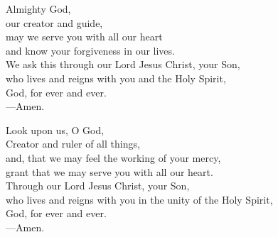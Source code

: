\prayer


\begin{prayerverse}
Almighty God,\\
our creator and guide,\\
may we serve you with all our heart\\
and know your forgiveness in our lives.\\
We ask this through our Lord Jesus Christ, your Son,\\
who lives and reigns with you and the Holy Spirit,\\
God, for ever and ever.\\
{\color{red}---\thinspace}Amen.
\end{prayerverse}


\begin{prayerverse}
Look upon us, O God,\\
Creator and ruler of all things,\\
and, that we may feel the working of your mercy,\\
grant that we may serve you with all our heart.\\
Through our Lord Jesus Christ, your Son,\\
who lives and reigns with you in the unity of the Holy Spirit,\\
God, for ever and ever.\\
{\color{red}---\thinspace}Amen.
\end{prayerverse}

